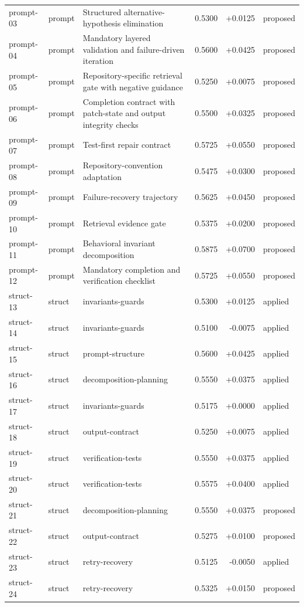 \begin{center}
\begin{longtable}{llp{5.2cm}rrl}
prompt-03 & prompt & Structured alternative-hypothesis elimination & 0.5300 & +0.0125 & proposed \\
prompt-04 & prompt & Mandatory layered validation and failure-driven iteration & 0.5600 & +0.0425 & proposed \\
prompt-05 & prompt & Repository-specific retrieval gate with negative guidance & 0.5250 & +0.0075 & proposed \\
prompt-06 & prompt & Completion contract with patch-state and output integrity checks & 0.5500 & +0.0325 & proposed \\
prompt-07 & prompt & Test-first repair contract & 0.5725 & +0.0550 & proposed \\
prompt-08 & prompt & Repository-convention adaptation & 0.5475 & +0.0300 & proposed \\
prompt-09 & prompt & Failure-recovery trajectory & 0.5625 & +0.0450 & proposed \\
prompt-10 & prompt & Retrieval evidence gate & 0.5375 & +0.0200 & proposed \\
prompt-11 & prompt & Behavioral invariant decomposition & 0.5875 & +0.0700 & proposed \\
prompt-12 & prompt & Mandatory completion and verification checklist & 0.5725 & +0.0550 & proposed \\
struct-13 & struct & invariants-guards & 0.5300 & +0.0125 & applied \\
struct-14 & struct & invariants-guards & 0.5100 & -0.0075 & applied \\
struct-15 & struct & prompt-structure & 0.5600 & +0.0425 & applied \\
struct-16 & struct & decomposition-planning & 0.5550 & +0.0375 & applied \\
struct-17 & struct & invariants-guards & 0.5175 & +0.0000 & applied \\
struct-18 & struct & output-contract & 0.5250 & +0.0075 & applied \\
struct-19 & struct & verification-tests & 0.5550 & +0.0375 & applied \\
struct-20 & struct & verification-tests & 0.5575 & +0.0400 & applied \\
struct-21 & struct & decomposition-planning & 0.5550 & +0.0375 & proposed \\
struct-22 & struct & output-contract & 0.5275 & +0.0100 & proposed \\
struct-23 & struct & retry-recovery & 0.5125 & -0.0050 & applied \\
struct-24 & struct & retry-recovery & 0.5325 & +0.0150 & proposed \\

\end{longtable}
\end{center}
